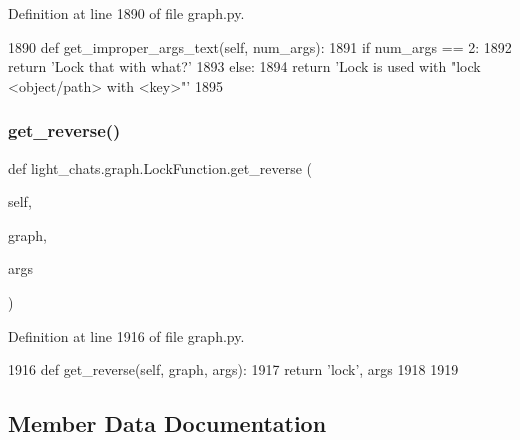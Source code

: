 Definition at line 1890 of file graph.\+py.


\begin{DoxyCode}
1890     \textcolor{keyword}{def }get\_improper\_args\_text(self, num\_args):
1891         \textcolor{keywordflow}{if} num\_args == 2:
1892             \textcolor{keywordflow}{return} \textcolor{stringliteral}{'Lock that with what?'}
1893         \textcolor{keywordflow}{else}:
1894             \textcolor{keywordflow}{return} \textcolor{stringliteral}{'Lock is used with "lock <object/path> with <key>"'}
1895 
\end{DoxyCode}
\mbox{\label{classlight__chats_1_1graph_1_1LockFunction_a90dd7a90a271b6d2f27b17f6796daa91}} 
\subsubsection{\texorpdfstring{get\+\_\+reverse()}{get\_reverse()}}
{\footnotesize\ttfamily def light\+\_\+chats.\+graph.\+Lock\+Function.\+get\+\_\+reverse (\begin{DoxyParamCaption}\item[{}]{self,  }\item[{}]{graph,  }\item[{}]{args }\end{DoxyParamCaption})}



Definition at line 1916 of file graph.\+py.


\begin{DoxyCode}
1916     \textcolor{keyword}{def }get\_reverse(self, graph, args):
1917         \textcolor{keywordflow}{return} \textcolor{stringliteral}{'lock'}, args
1918 
1919 
\end{DoxyCode}


\subsection{Member Data Documentation}
\mbox{\label{classlight__chats_1_1graph_1_1LockFunction_a5a4e9e70cf33889e84cc3d713cb3a270}} 
